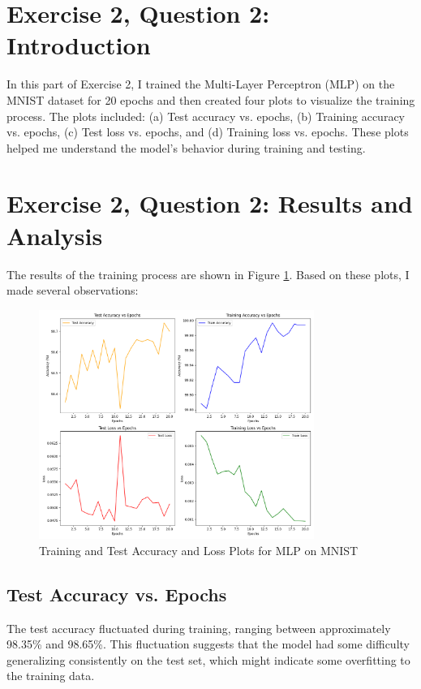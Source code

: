 \documentclass[10pt,letter,notitlepage]{article}
\begin{document}
\begin{center}
\section{Exercise 2, Question 2: Introduction}
In this part of Exercise 2, I trained the Multi-Layer Perceptron (MLP) on the MNIST dataset for 20 epochs and then created four plots to visualize the training process. The plots included: (a) Test accuracy vs. epochs, (b) Training accuracy vs. epochs, (c) Test loss vs. epochs, and (d) Training loss vs. epochs. These plots helped me understand the model's behavior during training and testing.

\section{Exercise 2, Question 2: Results and Analysis}
The results of the training process are shown in Figure \ref{fig:mlp_training_plots}. Based on these plots, I made several observations:

\begin{figure}[h]
    \centering
    \includegraphics[width=0.8\textwidth]{mlp_training_plots.png}
    \caption{Training and Test Accuracy and Loss Plots for MLP on MNIST}
    \label{fig:mlp_training_plots}
\end{figure}

\subsection{Test Accuracy vs. Epochs}
The test accuracy fluctuated during training, ranging between approximately 98.35\% and 98.65\%. This fluctuation suggests that the model had some difficulty generalizing consistently on the test set, which might indicate some overfitting to the training data.


\end{center}
\end{document}
